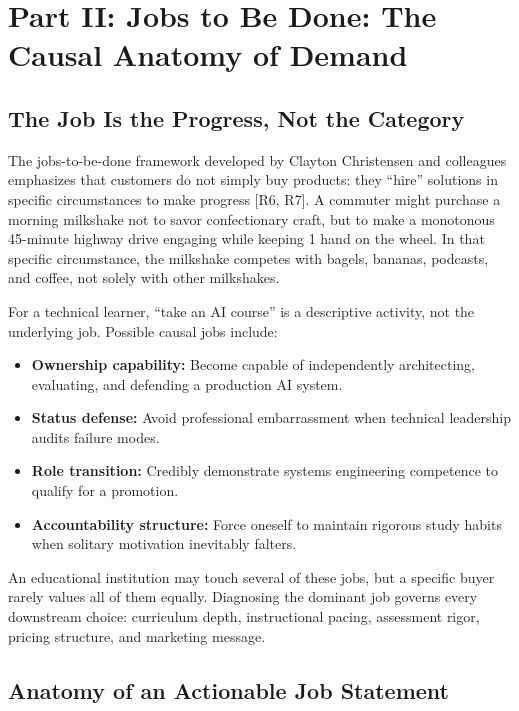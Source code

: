 \section{Part II: Jobs to Be Done: The Causal Anatomy of Demand}

\subsection{The Job Is the Progress, Not the Category}

The jobs-to-be-done framework developed by Clayton Christensen and colleagues emphasizes that customers do not simply buy products: they ``hire'' solutions in specific circumstances to make progress [R6, R7]. A commuter might purchase a morning milkshake not to savor confectionary craft, but to make a monotonous 45-minute highway drive engaging while keeping 1 hand on the wheel. In that specific circumstance, the milkshake competes with bagels, bananas, podcasts, and coffee, not solely with other milkshakes.

For a technical learner, ``take an AI course'' is a descriptive activity, not the underlying job. Possible causal jobs include:
\begin{itemize}[leftmargin=1.2em,itemsep=0.2ex]
  \item \textbf{Ownership capability:} Become capable of independently architecting, evaluating, and defending a production AI system.
  \item \textbf{Status defense:} Avoid professional embarrassment when technical leadership audits failure modes.
  \item \textbf{Role transition:} Credibly demonstrate systems engineering competence to qualify for a promotion.
  \item \textbf{Accountability structure:} Force oneself to maintain rigorous study habits when solitary motivation inevitably falters.
\end{itemize}

An educational institution may touch several of these jobs, but a specific buyer rarely values all of them equally. Diagnosing the dominant job governs every downstream choice: curriculum depth, instructional pacing, assessment rigor, pricing structure, and marketing message.

\subsection{Anatomy of an Actionable Job Statement}


